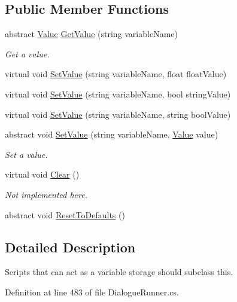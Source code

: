 \subsection*{Public Member Functions}
\begin{DoxyCompactItemize}
\item 
abstract \hyperlink{a00167}{Value} \hyperlink{a00170_ac981277018fe74c14491800caf29a7c5}{Get\-Value} (string variable\-Name)
\begin{DoxyCompactList}\small\item\em Get a value. \end{DoxyCompactList}\item 
virtual void \hyperlink{a00170_a869fa2dfd390c1ec63735b5763ba4d77}{Set\-Value} (string variable\-Name, float float\-Value)
\item 
virtual void \hyperlink{a00170_a08ff36ec352a979b5db074f66ec9e189}{Set\-Value} (string variable\-Name, bool string\-Value)
\item 
virtual void \hyperlink{a00170_a25df235b5446e93d5236a5fd5c17f6dd}{Set\-Value} (string variable\-Name, string bool\-Value)
\item 
abstract void \hyperlink{a00170_af524fea535a8de76d845bdb06c9cb0c2}{Set\-Value} (string variable\-Name, \hyperlink{a00167}{Value} value)
\begin{DoxyCompactList}\small\item\em Set a value. \end{DoxyCompactList}\item 
virtual void \hyperlink{a00170_a587fe10b367ace190e10f3bcb590a53c}{Clear} ()
\begin{DoxyCompactList}\small\item\em Not implemented here. \end{DoxyCompactList}\item 
abstract void \hyperlink{a00170_a33fcbff56561e53e0a70b59c56f0c3af}{Reset\-To\-Defaults} ()
\end{DoxyCompactItemize}


\subsection{Detailed Description}
Scripts that can act as a variable storage should subclass this. 

Definition at line 483 of file Dialogue\-Runner.\-cs.



